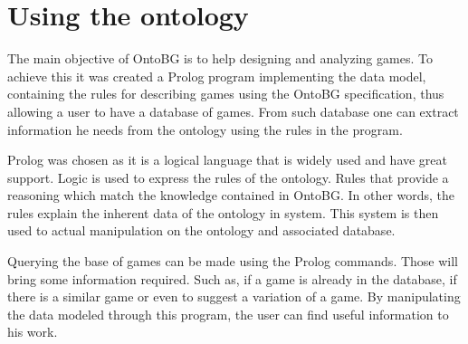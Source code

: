 \section{Using the ontology}

The main objective of OntoBG is to help designing and analyzing games. To achieve this it was created a Prolog program implementing the data model, containing the rules for describing games using the OntoBG specification, thus allowing a user to have a database of games. From such database one can extract information he needs from the ontology using the rules in the program.

Prolog was chosen as it is a logical language that is widely used and have great support. Logic is used to express the rules of the ontology. Rules that provide a reasoning which match the knowledge contained in OntoBG. In other words, the rules explain the inherent data of the ontology in system. This system is then used to actual manipulation on the ontology and associated database. 

Querying the base of games can be made using the Prolog commands. Those will bring some information required. Such as, if a game is already in the database, if there is a similar game or even to suggest a variation of a game. By manipulating the data modeled through this program, the user can find useful information to his work. 

